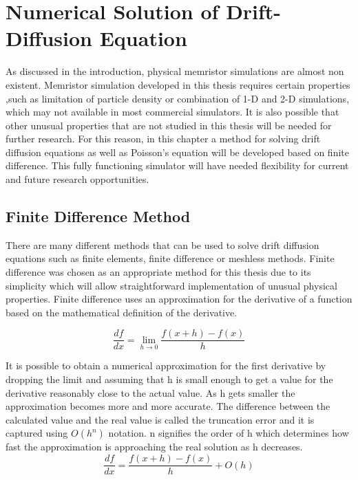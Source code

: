 

\chapter{Numerical Solution of Drift-Diffusion Equation} %

\label{Chapter3} %


As discussed in the introduction, physical memristor simulations are almost non existent. Memristor simulation developed in this thesis requires certain properties ,such as limitation of particle density or combination of 1-D and 2-D simulations, which may not available in most commercial simulators. It is also possible that other unusual properties that are not studied in this thesis will be needed for further research. For this reason, in this chapter a method for solving drift diffusion equations as well as Poisson's equation will be developed based on finite difference. This fully functioning simulator will have needed flexibility for current and future research opportunities.  


\section{Finite Difference Method}
There are many different methods that can be used to solve drift diffusion equations such as finite elements, finite difference or meshless methods. Finite difference was chosen as an appropriate method for this thesis due to its simplicity which will allow straightforward implementation of unusual physical properties. Finite difference uses an approximation for the derivative of a function based on the mathematical definition of the derivative.

\begin{equation}
\frac{df}{dx}=\lim\limits_{h \rightarrow 0} \frac{f(x+h)-f(x)}{h}
\end{equation}

It is possible to obtain a numerical approximation for the first derivative by dropping the limit and assuming that h is small enough to get a value for the derivative reasonably close to the actual value. As h gets smaller the approximation becomes more and more accurate. The difference between the calculated value and the real value is called the truncation error and it is captured using $O(h^n)$ notation. n signifies the order of h which determines how fast the approximation is approaching the real solution as h decreases.  
\begin{equation}
\frac{df}{dx}=\frac{f(x+h)-f(x)}{h} + O(h)
\label{numdif}
\end{equation}

